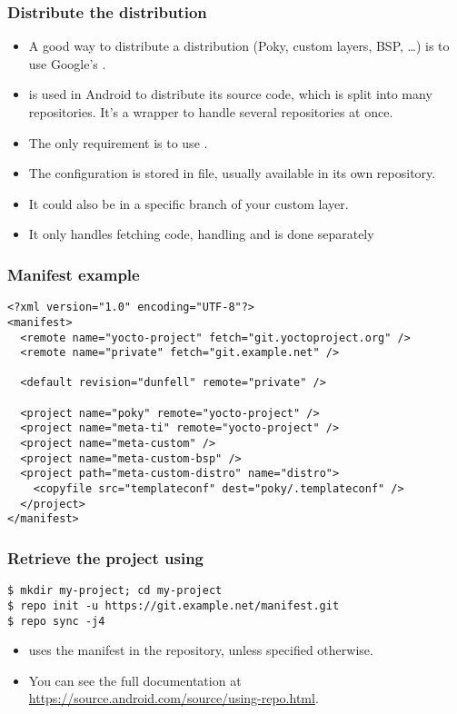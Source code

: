\begin{frame}
  \frametitle{Distribute the distribution}
  \begin{itemize}
    \item A good way to distribute a distribution (Poky, custom
      layers, BSP, \dots) is to use Google's
      .
    \item {} is used in Android to distribute its source
      code, which is split into many  repositories. It's a
      wrapper to handle several  repositories at once.
    \item The only requirement is to use .
    \item The  configuration is stored in 
      file, usually available in its own  repository.
  \item It could also be in a specific branch of your custom layer.
  \item It only handles fetching code, handling  and
     is done separately
  \end{itemize}
\end{frame}

\begin{frame}[fragile]
  \frametitle{Manifest example}
  \begin{block}{}
  \fontsize{9}{9}\selectfont
  \begin{verbatim}
<?xml version="1.0" encoding="UTF-8"?>
<manifest>
  <remote name="yocto-project" fetch="git.yoctoproject.org" />
  <remote name="private" fetch="git.example.net" />

  <default revision="dunfell" remote="private" />

  <project name="poky" remote="yocto-project" />
  <project name="meta-ti" remote="yocto-project" />
  <project name="meta-custom" />
  <project name="meta-custom-bsp" />
  <project path="meta-custom-distro" name="distro">
    <copyfile src="templateconf" dest="poky/.templateconf" />
  </project>
</manifest>
  \end{verbatim}
  \end{block}
\end{frame}

\begin{frame}[fragile]
  \frametitle{Retrieve the project using }
  \begin{verbatim}
$ mkdir my-project; cd my-project
$ repo init -u https://git.example.net/manifest.git
$ repo sync -j4
  \end{verbatim}
  \begin{itemize}
    \item {} uses the  manifest in the
    repository, unless specified otherwise.
    \item You can see the full  documentation at
      \url{https://source.android.com/source/using-repo.html}.
  \end{itemize}
\end{frame}

